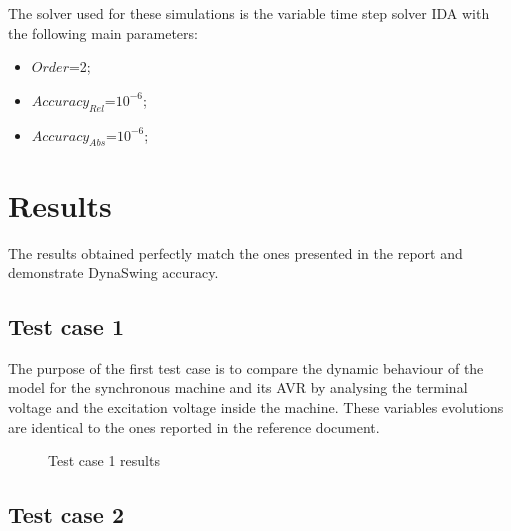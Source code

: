 \documentclass[a4paper, 12pt]{report}
\begin{document}
The solver used for these simulations is the variable time step solver IDA with the following main parameters:
\begin{itemize}
\item $Order$=2;
\item $Accuracy_{Rel}$=$10^{-6}$;
\item $Accuracy_{Abs}$=$10^{-6}$;
\end{itemize}

\section{Results}

The results obtained perfectly match the ones presented in the report and demonstrate DynaSwing accuracy.

\subsection{Test case 1}

The purpose of the first test case is to compare the dynamic behaviour of the model for the synchronous machine and its AVR by analysing the terminal voltage and the excitation voltage inside the machine. These variables evolutions are identical to the ones reported in the reference document.

\begin{figure}[H]
\caption{Test case 1 results}
\end{figure}

\subsection{Test case 2}
\end{document}
